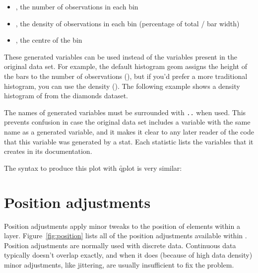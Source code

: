 \begin{itemize}
  \item {}, the number of observations in each bin
  \item {}, the density of observations in each bin (percentage of total / bar width)
  \item {}, the centre of the bin
\end{itemize}

These generated variables can be used instead of the variables present in the original data set.  For example, the default histogram geom assigns the height of the bars to the number of observations (), but if you'd prefer a more traditional histogram, you can use the density ().   The following example shows a density histogram of  from the diamonds dataset.

% 


The names of generated variables must be surrounded with {\tt ..} when used.  This prevents confusion in case the original data set includes a variable with the same name as a generated variable, and it makes it clear to any later reader of the code that this variable was generated by a stat.  Each statistic lists the variables that it creates in its documentation.

The syntax to produce this plot with \f{qplot} is very similar:

% 


\section{Position adjustments}
\label{sec:position}

Position adjustments apply minor tweaks to the position of elements within a layer.  Figure~\ref{fig:position} lists all of the position adjustments available within \ggplot.  Position adjustments are normally used with discrete data.  Continuous data typically doesn't overlap exactly, and when it does (because of high data density) minor adjustments, like jittering, are usually insufficient to fix the problem.

